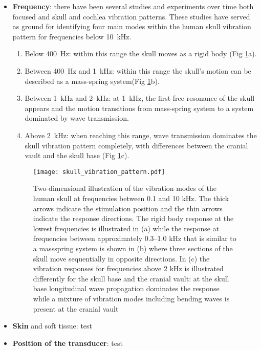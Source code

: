 \begin{itemize}
\item \textbf{Frequency}: there have been several studies and experiments over time both focused and skull and cochlea vibration patterns. These studies have served as ground for identifying four main modes within the human skull vibration pattern for frequencies below \SI{10}{\kilo\hertz}.
\begin{enumerate}
\item Below \SI{400}{\hertz}: within this range the skull moves as a rigid body (Fig \ref{fig:skull_vibration_pattern}a).\citep{stenfelt_2005b}
\item Between \SI{400}{\hertz} and \SI{1}{\kilo\hertz}: within this range the skull's motion can be described as a mass-spring system(Fig \ref{fig:skull_vibration_pattern}b).
\item Between \SI{1}{\kilo\hertz} and \SI{2}{\kilo\hertz}: at \SI{1}{\kilo\hertz}, the first free resonance of the skull appears \citep{hakansson_1994} and the motion transitions from mass-spring system to a system dominated by wave transmission.
\item Above \SI{2}{\kilo\hertz}: when reaching this range, wave transmission dominates the skull vibration pattern completely, with differences between the cranial vault and the skull base (Fig \ref{fig:skull_vibration_pattern}c).
\end{enumerate}
\begin{figure}[H]
	\centering
		\texttt{[image: skull\_vibration\_pattern.pdf]}
		\caption{Two-dimensional illustration of the vibration modes of the human skull at frequencies between 0.1 and 10 kHz. The thick arrows indicate the stimulation position and the thin arrows indicate the response directions. The rigid body response at the lowest frequencies is illustrated in (a) while the response at frequencies between approximately 0.3–1.0 kHz that is similar to a massspring system is shown in (b) where three sections of the skull move sequentially in opposite directions. In (c) the vibration responses for frequencies above 2 kHz is illustrated differently for the skull base and the cranial vault: at the skull base longitudinal wave propagation dominates the response while a mixture of vibration modes including bending waves is present at the cranial vault \citep{puria_2013}}
		\label{fig:skull_vibration_pattern}
\end{figure}
\item \textbf{Skin} and soft tissue: test
\item \textbf{Position of the transducer}: test
\end{itemize}
